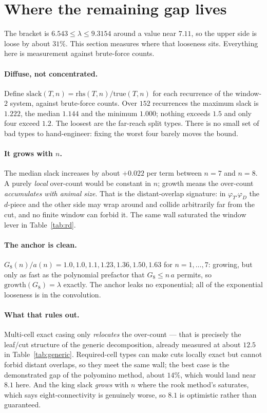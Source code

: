 \documentclass[11pt]{article}
\begin{document}
\section{Where the remaining gap lives}
\label{sec:gap}

The bracket is $6.543 \le \lambda \le 9.3154$ around a value near $7.11$, so the
upper side is loose by about $31\%$. This section measures where that looseness
sits. Everything here is measurement against brute-force counts.

\paragraph{Diffuse, not concentrated.} Define
$\mathrm{slack}(T,n) = \mathrm{rhs}(T,n)/\mathrm{true}(T,n)$ for each recurrence
of the window-$2$ system, against brute-force counts. Over $152$ recurrences the
maximum slack is $1.222$, the median $1.144$ and the minimum $1.000$; nothing
exceeds $1.5$ and only four exceed $1.2$. The loosest are the far-reach split
types. There is no small set of bad types to hand-engineer: fixing the worst four
barely moves the bound.

\paragraph{It grows with $n$.} The median slack increases by about $+0.022$ per
term between $n = 7$ and $n = 8$. A purely \emph{local} over-count would be
constant in $n$; growth means the over-count \emph{accumulates with animal
size}. That is the distant-overlap signature: in $\varphi_{T'}\varphi_D$ the
$d$-piece and the other side may wrap around and collide arbitrarily far from
the cut, and no finite window can forbid it. The same wall saturated the window
lever in Table~\ref{tab:rd}.

\paragraph{The anchor is clean.} $G_8(n)/a(n) = 1.0, 1.0, 1.1, 1.23, 1.36, 1.50,
1.63$ for $n = 1,\dots,7$: growing, but only as fast as the polynomial prefactor
that $G_8 \le n\,a$ permits, so $\mathrm{growth}(G_8) = \lambda$ exactly. The
anchor leaks no exponential; all of the exponential looseness is in the
convolution.

\paragraph{What that rules out.} Multi-cell exact casing only \emph{relocates}
the over-count --- that is precisely the leaf/cut structure of the generic
decomposition, already measured at about $12.5$ in Table~\ref{tab:generic}.
Required-cell types can make cuts locally exact but cannot forbid distant
overlaps, so they meet the same wall; the best case is the demonstrated gap of
the polyomino method, about $14\%$, which would land near $8.1$ here. And the
king slack \emph{grows} with $n$ where the rook method's saturates, which says
eight-connectivity is genuinely worse, so $8.1$ is optimistic rather than
guaranteed.
\end{document}
